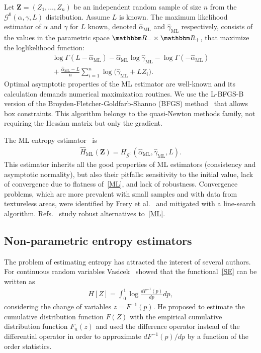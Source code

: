 \documentclass[journal]{IEEEtran}
\begin{document}
Let $\bm Z = (Z_1,\dots, Z_n)$ be an independent random sample of size $n$ from the $\mathcal G^0(\alpha,\gamma,L)$ distribution.
Assume $L$ is known.
The maximum likelihood estimator of $\alpha$ and $\gamma$ for $L$ known, denoted $\widehat\alpha_{\text{ML}}$ and $\widehat\gamma_{\text{ML}}$ respectively, consists of the values in the parametric space $\mathbbm R_-\times\mathbbm R_+$, that maximize the loglikelihood function:
\begin{multline}
	\log \Gamma(L-\widehat\alpha_{\text{ML}})-
	\widehat\alpha_{\text{ML}}\log \widehat\gamma_{\text{ML}} -\log\Gamma(-\widehat\alpha_{\text{ML}})  \\
	\mbox{}+\frac{\widehat\alpha_{\text{ML}}-L}{n} \sum_{i=1}^n\log\big(\widehat\gamma_{\text{ML}}+L Z_i\big).
	\label{ML}
\end{multline}
Optimal asymptotic properties of the ML estimator are well-known and its calculation demands numerical maximization routines.
We use the L-BFGS-B version of the Broyden-Fletcher-Goldfarb-Shanno (BFGS) method~\cite{Luenberger2008} that allows box constraints.
This algorithm belongs to the quasi-Newton methods family, not requiring the Hessian matrix but only the gradient.

The ML entropy estimator~\cite{CaseBerg01} is
\begin{align}
	\widehat{H}_\text{ML}(\bm Z)=H_{\mathcal G^0}(\widehat{\alpha}_{\text{ML}},\widehat{\gamma}_{\text{ML}},L).
\end{align}
This estimator inherits all the good properties of ML estimators (consistency and asymptotic normality), but also their pitfalls: sensitivity to the initial value, lack of convergence due to flatness of~\eqref{ML}, and lack of robustness.
Convergence problems, which are more prevalent with small samples and with data from textureless areas, were identified by Frery et al.~\cite{FreryCribariSouza:JASP:04} and mitigated with a line-search algorithm.
Refs.~\cite{BustosFreryLucini:Mestimators:2001,AllendeFreryetal:JSCS:05,gambini2015} study robust alternatives to~\eqref{ML}.

\subsection{Non-parametric entropy estimators}
\label{Hest}

The problem of estimating entropy has attracted the interest of several authors. 
For continuous random variables Vasicek~\cite{Vasicek76} showed that the functional~\eqref{SE} can be written as
\begin{align}
	H[Z]=\int_{0}^{1} \log \frac{d F^{-1}(p)}{d p} d p,
\end{align}
considering the change of variables $z=F^{-1}(p).$
He proposed to estimate the cumulative distribution function  $F(Z)$ with the empirical cumulative distribution function $F_n(z)$ and used the difference operator instead of the differential operator in order to approximate ${d F^{-1}(p)}/{d p}$ by a function of the order statistics.
\end{document}
